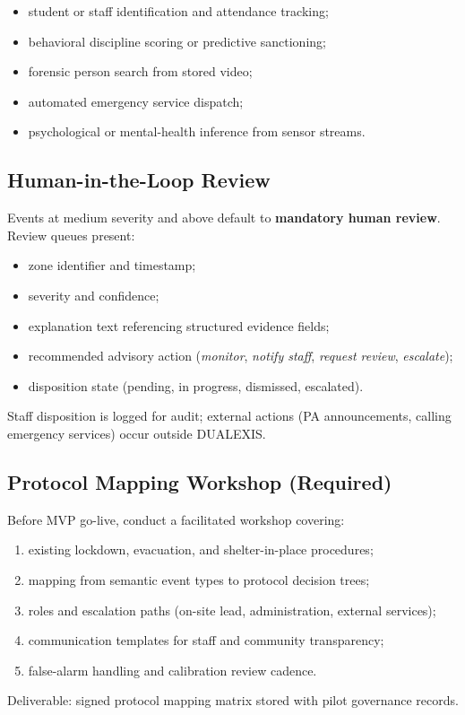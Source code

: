 \begin{itemize}[noitemsep]
  \item student or staff identification and attendance tracking;
  \item behavioral discipline scoring or predictive sanctioning;
  \item forensic person search from stored video;
  \item automated emergency service dispatch;
  \item psychological or mental-health inference from sensor streams.
\end{itemize}

\subsection{Human-in-the-Loop Review}

Events at medium severity and above default to \textbf{mandatory human review}.
Review queues present:
\begin{itemize}[noitemsep]
  \item zone identifier and timestamp;
  \item severity and confidence;
  \item explanation text referencing structured evidence fields;
  \item recommended advisory action (\emph{monitor}, \emph{notify staff}, \emph{request review},
        \emph{escalate});
  \item disposition state (pending, in progress, dismissed, escalated).
\end{itemize}

Staff disposition is logged for audit; external actions (PA announcements, calling emergency
services) occur outside DUALEXIS.

\subsection{Protocol Mapping Workshop (Required)}

Before MVP go-live, conduct a facilitated workshop covering:
\begin{enumerate}[noitemsep]
  \item existing lockdown, evacuation, and shelter-in-place procedures;
  \item mapping from semantic event types to protocol decision trees;
  \item roles and escalation paths (on-site lead, administration, external services);
  \item communication templates for staff and community transparency;
  \item false-alarm handling and calibration review cadence.
\end{enumerate}

Deliverable: signed protocol mapping matrix stored with pilot governance records.
